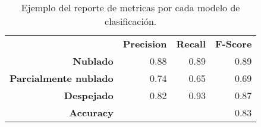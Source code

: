 \begin{table}[H]
	\centering
	\begin{tabular}{rrrr} \cline{2-4}
		                              & \textbf{Precision} & \textbf{Recall} & \textbf{F-Score} \\ \cline{2-4}
		\textbf{Nublado}              & 0.88               & 0.89            & 0.89             \\
		\textbf{Parcialmente nublado} & 0.74               & 0.65            & 0.69             \\
		\textbf{Despejado}            & 0.82               & 0.93            & 0.87             \\
		\textbf{Accuracy}             &                    &                 & 0.83             \\ \hline
	\end{tabular}
	\caption{Ejemplo del reporte de metricas por cada modelo de clasificación.}
	\label{table:report}
\end{table}
